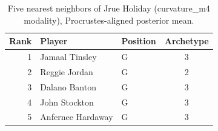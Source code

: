 \begin{table}[htbp]
  \centering\small
  \begin{tabular}{rllc}
    \toprule
    Rank & Player & Position & Archetype \\
    \midrule
    1 & Jamaal Tinsley & G & 3 \\
    2 & Reggie Jordan & G & 2 \\
    3 & Dalano Banton & G & 3 \\
    4 & John Stockton & G & 3 \\
    5 & Anfernee Hardaway & G & 3 \\
    \bottomrule
  \end{tabular}
  \caption{Five nearest neighbors of Jrue Holiday (curvature_m4 modality), Procrustes-aligned posterior mean.}
  \label{tab:Jrue_Holiday_neighbors_curvature_m4}
\end{table}

